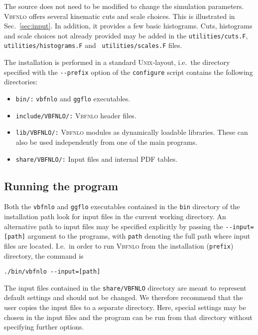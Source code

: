 \documentclass[english,12pt]{article}
\begin{document}
The source does not need to be modified to change the simulation parameters.
\textsc{Vbfnlo} offers several kinematic cuts and scale choices. This is
illustrated in Sec.~\ref{sec:input}. In addition, it provides a few basic
histograms. Cuts, histograms and scale choices not already provided may be
added in the {\tt utilities/cuts.F}, {\tt utilities/histograms.F} and {\tt
utilities/scales.F} files.

The installation is performed in a standard \textsc{Unix}-layout, i.e.\ the directory
specified with the {\tt -{}-prefix} option of the {\tt configure} script contains the
following directories:
\begin{itemize}
\item {\tt bin/:} {\tt vbfnlo} and {\tt ggflo} executables.
\item {\tt include/VBFNLO/:} \textsc{Vbfnlo} header files. 
\item {\tt lib/VBFNLO/:} \textsc{Vbfnlo} modules as dynamically loadable
  libraries. These can also
be used independently from one of the main programs.
\item {\tt share/VBFNLO/:} Input files and internal PDF tables.
\end{itemize}


\subsection{Running the program}

Both the {\tt vbfnlo} and {\tt ggflo} executables contained in the {\tt bin}
directory of the installation path look for input files in the current working
directory. An alternative path to input files may be specified explicitly by
passing the {\tt -{}-input=[path]} argument to the programs, with {\tt path}
denoting the full path where input files are located.  I.e.\ in order to run
\textsc{Vbfnlo} from the installation ({\tt prefix}) directory, the command is
\begin{center}
{\tt ./bin/vbfnlo -{}-input=[path]}
\end{center}
The input files contained in the {\tt share/VBFNLO} directory are meant to
represent default settings and should not be changed. We therefore recommend
that the user copies the input files to a separate directory. Here, special
settings may be chosen in the input files and the program can be run from that
directory without specifying further options.  
\end{document}
